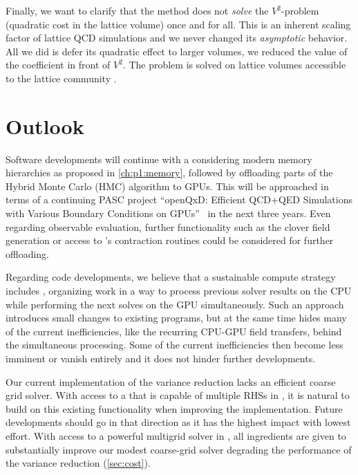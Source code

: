 Finally, we want to clarify that the method does not \emph{solve} the $V^{2}$-problem (quadratic cost in the lattice volume) once and for all.
This is an inherent scaling factor of lattice QCD simulations and we never changed its \emph{asymptotic} behavior.
All we did is defer its quadratic effect to larger volumes, \ie we reduced the value of the coefficient in front of $V^{2}$.
The problem is solved on lattice volumes accessible to the lattice community .

\section{Outlook}

Software developments will continue with a  considering modern memory hierarchies as proposed in \cref{ch:p1:memory}, followed by offloading parts of the Hybrid Monte Carlo (HMC) algorithm to GPUs.
This will be approached in terms of a continuing PASC project ``openQxD: Efficient QCD+QED Simulations with Various Boundary Conditions on GPUs''~\cite{online:pasc2025} in the next three years.
Even regarding observable evaluation, further functionality such as the  clover field generation or access to \quda's contraction routines could be considered for further offloading.

Regarding code developments, we believe that a sustainable compute strategy includes , organizing work in a way to process previous solver results on the CPU while performing the next solves on the GPU simultaneously.
Such an approach introduces small changes to existing programs, but at the same time hides many of the current inefficiencies, like the recurring CPU-GPU field transfers, behind the simultaneous processing.
Some of the current inefficiencies then become less imminent or vanish entirely and it does not hinder further developments.


Our current implementation of the variance reduction lacks an efficient coarse grid solver.
With access to a  that is capable of multiple RHSs in \quda, it is natural to build on this existing functionality when improving the implementation.
Future developments should go in that direction as it has the highest impact with lowest effort.
With access to a powerful multigrid solver in \quda, all ingredients are given to substantially improve our modest coarse-grid solver degrading the performance of the variance reduction (\cref{sec:cost}).



